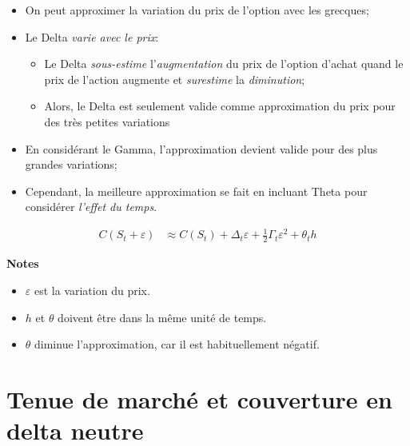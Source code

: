\documentclass[10pt, french]{article}
\begin{document}
\begin{multicols*}{2}
\begin{itemize}[leftmargin = *]
	\item	On peut approximer la variation du prix de l'option avec les grecques;
	\item	Le Delta \textit{varie avec le prix}: 
		\begin{itemize}
		\item	Le Delta \textit{sous-estime} l'\textit{augmentation} du prix de l'option d'achat quand le prix de l'action augmente et \textit{surestime} la \textit{diminution};
		\item	Alors, le Delta est seulement valide comme approximation du prix pour des très petites variations
		\end{itemize}
	\item	En considérant le Gamma, l'approximation devient valide pour des plus grandes variations;
	\item	Cependant, la meilleure approximation se fait en incluant Theta pour considérer \textit{l'effet du temps}.
\end{itemize}

\begin{definitionNOHFILL}
\begin{align*}
	C(S_{t} + \varepsilon)
	&\approx	C(S_{t}) + \Delta_{t} \varepsilon + \frac{1}{2} \Gamma_{t} \varepsilon^{2} + \theta_{t} h
\end{align*}

\tcbline

\textbf{Notes}
\begin{itemize}[leftmargin = *]
	\item	$\varepsilon$ est la variation du prix.
	\item	$h$ et $\theta$ doivent être dans la même unité de temps.
	\item	$\theta$ diminue l'approximation, car il est habituellement négatif.
\end{itemize}
\end{definitionNOHFILL}


\newpage

\section{Tenue de marché et couverture en delta neutre}


\end{multicols*}
\end{document}
